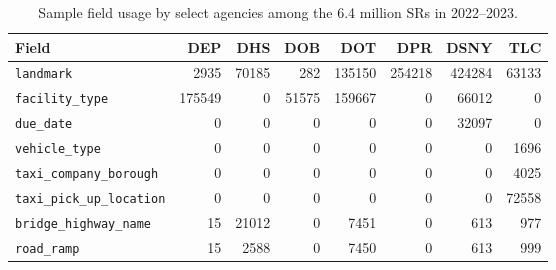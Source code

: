 \documentclass[linenumber]{jdsart}
\begin{document}
\begin{table}[tbp]
\centering
\caption{Sample field usage by select agencies among the 6.4 million
  SRs in 2022--2023. }
\label{tab:field-usage-by-agency}
\small
\begin{tabular}{lrrrrrrr}
\toprule
\textbf{\textbf{Field}} & \textbf{DEP} & \textbf{DHS} & \textbf{DOB} & \textbf{DOT} & \textbf{DPR} & \textbf{DSNY} & \textbf{TLC} \\
\midrule
\texttt{landmark}                  & 2935     & 70185    & 282      & 135150   & 254218   & 424284   & 63133  \\
\texttt{facility\_type}            & 175549   & 0        & 51575    & 159667   & 0        & 66012    & 0      \\
\texttt{due\_date}                 & 0        & 0        & 0        & 0        & 0        & 32097    & 0      \\
\texttt{vehicle\_type}             & 0        & 0        & 0        & 0        & 0        & 0        & 1696   \\
\texttt{taxi\_company\_borough}    & 0        & 0        & 0        & 0        & 0        & 0        & 4025   \\
\texttt{taxi\_pick\_up\_location}  & 0        & 0        & 0        & 0        & 0        & 0        & 72558  \\
\texttt{bridge\_highway\_name}     & 15       & 21012    & 0        & 7451     & 0        & 613      & 977    \\
\texttt{road\_ramp}                & 15       & 2588     & 0        & 7450     & 0        & 613      & 999    \\
\bottomrule
\end{tabular}
\end{table}
\end{document}
